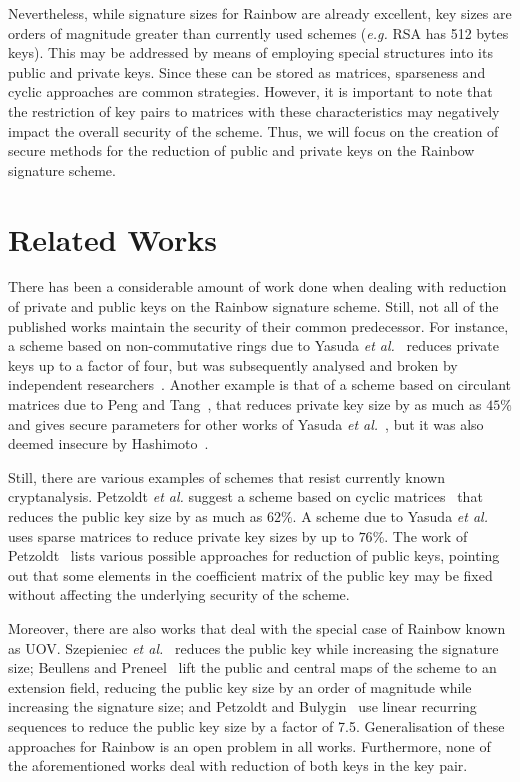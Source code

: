 \documentclass[10pt]{article}
\begin{document}
Nevertheless, while signature sizes for Rainbow are already excellent, key sizes are orders of magnitude greater than currently used schemes (\emph{e.g.} RSA has 512 bytes keys). This may be addressed by means of employing special structures into its public and private keys. Since these can be stored as matrices, sparseness and cyclic approaches are common strategies. However, it is important to note that the restriction of key pairs to matrices with these characteristics may negatively impact the overall security of the scheme. Thus, we will focus on the creation of secure methods for the reduction of public and private keys on the Rainbow signature scheme.

\section{Related Works}

There has been a considerable amount of work done when dealing with reduction of private and public keys on the Rainbow signature scheme. Still, not all of the published works maintain the security of their common predecessor. For instance, a scheme based on non-commutative rings due to Yasuda \emph{et al.}~\cite{Yasuda:inproc:2012:feb} reduces private keys up to a factor of four, but was subsequently analysed and broken by independent researchers~\cite{Hashimoto:inproc:2013:feb,Thomae:inproc:2012:sep}. Another example is that of a scheme based on circulant matrices due to Peng and Tang~\cite{Peng:article:2017:jun}, that reduces private key size by as much as $45\%$ and gives secure parameters for other works of Yasuda \emph{et al.}~\cite{Yasuda:inproc:2013:may,Yasuda:inproc:2014:apr}, but it was also deemed insecure by Hashimoto~\cite{Hashimoto:misc:2018:oct}. 

Still, there are various examples of schemes that resist currently known cryptanalysis. Petzoldt \emph{et al.} suggest a scheme based on cyclic matrices~\cite{Petzoldt:inproc:2010:dec} that reduces the public key size by as much as $62\%$. A scheme due to Yasuda \emph{et al.}~\cite{Yasuda:article:2014:sep} uses sparse matrices to reduce private key sizes by up to $76\%$. The work of Petzoldt~\cite{Petzoldt:phd:2013:jul} lists various possible approaches for reduction of public keys, pointing out that some elements in the coefficient matrix of the public key may be fixed without affecting the underlying security of the scheme. 

Moreover, there are also works that deal with the special case of Rainbow known as UOV. Szepieniec \emph{et al.}~\cite{Szepieniec:inproc:2017:jun} reduces the public key while increasing the signature size; Beullens and Preneel~\cite{Beullens:inproc:2017:dec} lift the public and central maps of the scheme to an extension field, reducing the public key size by an order of magnitude while increasing the signature size; and Petzoldt and Bulygin~\cite{Petzoldt:inproc:2012:nov} use linear recurring sequences to reduce the public key size by a factor of 7.5. Generalisation of these approaches for Rainbow is an open problem in all works. Furthermore, none of the aforementioned works deal with reduction of both keys in the key pair.
\end{document}
